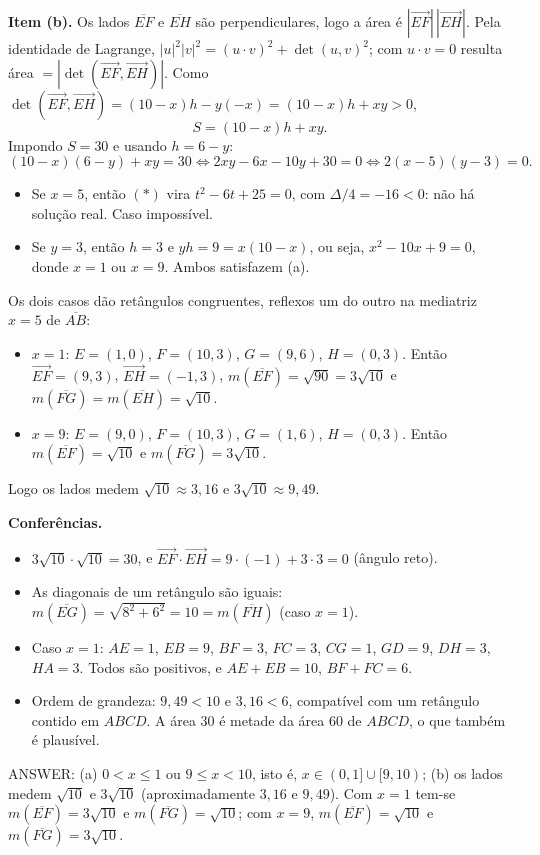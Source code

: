 \documentclass{article}%
\begin{document}
\textbf{Item (b).} Os lados $\overline{EF}$ e $\overline{EH}$ são perpendiculares, logo a área é $|\vec{EF}|\,|\vec{EH}|$. Pela identidade de Lagrange, $|u|^2|v|^2=(u\cdot v)^2+\det(u,v)^2$; com $u\cdot v=0$ resulta área $=|\det(\vec{EF},\vec{EH})|$. Como $\det(\vec{EF},\vec{EH})=(10-x)h-y(-x)=(10-x)h+xy>0$,
\[
S=(10-x)h+xy .
\]
Impondo $S=30$ e usando $h=6-y$:
\[
(10-x)(6-y)+xy=30 \iff 2xy-6x-10y+30=0 \iff 2(x-5)(y-3)=0 .
\]
\begin{itemize}
\item Se $x=5$, então $(*)$ vira $t^2-6t+25=0$, com $\Delta/4=-16<0$: não há solução real. Caso impossível.
\item Se $y=3$, então $h=3$ e $yh=9=x(10-x)$, ou seja, $x^2-10x+9=0$, donde $x=1$ ou $x=9$. Ambos satisfazem (a).
\end{itemize}
Os dois casos dão retângulos congruentes, reflexos um do outro na mediatriz $x=5$ de $\overline{AB}$:
\begin{itemize}
\item $x=1$: $E=(1,0)$, $F=(10,3)$, $G=(9,6)$, $H=(0,3)$. Então $\vec{EF}=(9,3)$, $\vec{EH}=(-1,3)$, $m(\overline{EF})=\sqrt{90}=3\sqrt{10}$ e $m(\overline{FG})=m(\overline{EH})=\sqrt{10}$.
\item $x=9$: $E=(9,0)$, $F=(10,3)$, $G=(1,6)$, $H=(0,3)$. Então $m(\overline{EF})=\sqrt{10}$ e $m(\overline{FG})=3\sqrt{10}$.
\end{itemize}
Logo os lados medem $\sqrt{10}\approx 3{,}16$ e $3\sqrt{10}\approx 9{,}49$.

\textbf{Conferências.}
\begin{itemize}
\item $3\sqrt{10}\cdot\sqrt{10}=30$, e $\vec{EF}\cdot\vec{EH}=9\cdot(-1)+3\cdot 3=0$ (ângulo reto).
\item As diagonais de um retângulo são iguais: $m(\overline{EG})=\sqrt{8^2+6^2}=10=m(\overline{FH})$ (caso $x=1$).
\item Caso $x=1$: $AE=1$, $EB=9$, $BF=3$, $FC=3$, $CG=1$, $GD=9$, $DH=3$, $HA=3$. Todos são positivos, e $AE+EB=10$, $BF+FC=6$.
\item Ordem de grandeza: $9{,}49<10$ e $3{,}16<6$, compatível com um retângulo contido em $ABCD$. A área $30$ é metade da área $60$ de $ABCD$, o que também é plausível.
\end{itemize}

ANSWER: (a) $0<x\le 1$ ou $9\le x<10$, isto é, $x\in(0,1]\cup[9,10)$; (b) os lados medem $\sqrt{10}$ e $3\sqrt{10}$ (aproximadamente $3{,}16$ e $9{,}49$). Com $x=1$ tem-se $m(\overline{EF})=3\sqrt{10}$ e $m(\overline{FG})=\sqrt{10}$; com $x=9$, $m(\overline{EF})=\sqrt{10}$ e $m(\overline{FG})=3\sqrt{10}$.%
\newpage%
\end{document}
